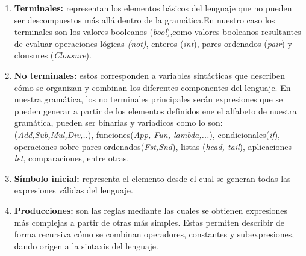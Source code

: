 \documentclass[a4paper,12pt]{article}
\begin{document}
\begin{enumerate}
    \item \textbf{Terminales:} representan los elementos básicos del lenguaje que no pueden ser descompuestos más allá dentro de la gramática.En nuestro caso los terminales son los valores booleanos (\textit{bool}),como valores booleanos resultantes de evaluar operaciones lógicas \textit{(not)}, enteros (\textit{int}), pares ordenados (\textit{pair}) y clousures (\textit{Clousure}).
    \item \textbf{No terminales:} estos corresponden a variables sintácticas que describen cómo se organizan y combinan los diferentes componentes del lenguaje. En nuestra gramática, los no terminales principales serán expresiones que se pueden generar a partir de los elementos definidos ene el alfabeto de nuestra gramática, pueden ser binarias y variadicos como lo son: (\textit{Add,Sub,Mul,Div,..}), funciones(\textit{App, Fun, lambda,...}), condicionales(\textit{if}), operaciones sobre pares ordenados(\textit{Fst,Snd}), listas (\textit{head, tail}), aplicaciones \textit{let}, comparaciones, entre otras.
    \item \textbf{Símbolo inicial:} representa el elemento desde el cual se generan todas las expresiones válidas del lenguaje. 
    \item \textbf{Producciones:} son las reglas mediante las cuales se obtienen expresiones más complejas a partir de otras más simples. Estas permiten describir de forma recursiva cómo se combinan operadores, constantes y subexpresiones, dando origen a la sintaxis del lenguaje.
\end{enumerate} 
\end{document}
